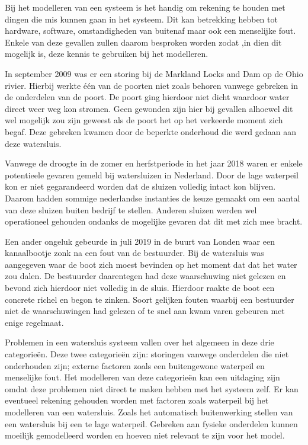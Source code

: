 \documentclass[../literatuuronderzoek.tex]{subfiles}
\begin{document}
Bij het modelleren van een systeem is het handig om rekening te houden met dingen die mis kunnen gaan in het systeem.
Dit kan betrekking hebben tot hardware, software, omstandigheden van buitenaf maar ook een menselijke fout.
Enkele van deze gevallen zullen daarom besproken worden zodat ,in dien dit mogelijk is, deze kennis te gebruiken bij het modelleren.

In september 2009 was er een storing bij de Markland Locks and Dam op de Ohio rivier. 
Hierbij werkte één van de poorten niet zoals behoren vanwege gebreken in de onderdelen van de poort\cite{herald-dispatch_2009}.  
De poort ging hierdoor niet dicht waardoor water direct weer weg kon stromen.
Geen gewonden zijn hier bij gevallen alhoewel dit wel mogelijk zou zijn geweest als de poort het op het verkeerde moment zich begaf.
Deze gebreken kwamen door de beperkte onderhoud die werd gedaan aan deze watersluis.

Vanwege de droogte in de zomer en herfstperiode in het jaar 2018 waren er enkele potentieele gevaren gemeld bij watersluizen in Nederland\cite{poelgeest_2020}.
Door de lage waterpeil kon er niet gegarandeerd worden dat de sluizen volledig intact kon blijven.
Daarom hadden sommige nederlandse instanties de keuze gemaakt om een aantal van deze sluizen buiten bedrijf te stellen.
Anderen sluizen werden wel operationeel gehouden ondanks de mogelijke gevaren dat dit met zich mee bracht.

Een ander ongeluk gebeurde in juli 2019 in de buurt van Londen waar een kanaalbootje zonk na een fout van de bestuurder\cite{james_rodger_2019}.
Bij de watersluis was aangegeven waar de boot zich moest bevinden op het moment dat dat het water zou dalen.
De bestuurder daarentegen had deze waarschuwing niet gelezen en bevond zich hierdoor niet volledig in de sluis.
Hierdoor raakte de boot een concrete richel en begon te zinken.
Soort gelijken fouten waarbij een bestuurder niet de waarschuwingen had gelezen of te snel aan kwam varen gebeuren met enige regelmaat.

Problemen in een watersluis systeem vallen over het algemeen in deze drie categorieën. 
Deze twee categorieën zijn: storingen vanwege onderdelen die niet onderhouden zijn; externe factoren zoals een buitengewone waterpeil en menselijke fout.
Het modelleren van deze categorieën kan een uitdaging zijn omdat deze problemen niet direct te maken hebben met het systeem zelf.
Er kan eventueel rekening gehouden worden met factoren zoals waterpeil bij het modelleren van een watersluis. 
Zoals het automatisch buitenwerking stellen van een watersluis bij een te lage waterpeil. 
Gebreken aan fysieke onderdelen kunnen moeilijk gemodelleerd worden en hoeven niet relevant te zijn voor het model.
\end{document}
